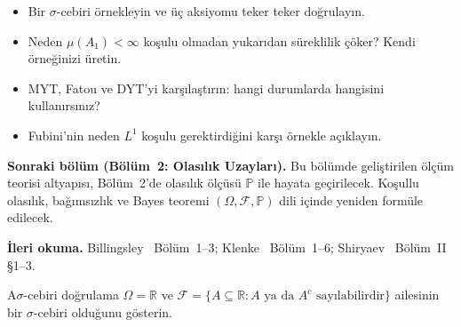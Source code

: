 \begin{ozyansima}
\begin{itemize}
  \item Bir $\sigma$-cebiri örnekleyin ve üç aksiyomu teker teker doğrulayın.
  \item Neden $\mu(A_1) < \infty$ koşulu olmadan yukarıdan süreklilik çöker?
        Kendi örneğinizi üretin.
  \item MYT, Fatou ve DYT'yi karşılaştırın: hangi durumlarda hangisini kullanırsınız?
  \item Fubini'nin neden $L^1$ koşulu gerektirdiğini karşı örnekle açıklayın.
\end{itemize}
\end{ozyansima}

\begin{kopru}
\textbf{Sonraki bölüm (Bölüm~2: Olasılık Uzayları).}
Bu bölümde geliştirilen ölçüm teorisi altyapısı, Bölüm~2'de olasılık ölçüsü
$\mathbb{P}$ ile hayata geçirilecek. Koşullu olasılık, bağımsızlık ve Bayes
teoremi $(\Omega,\mathcal{F},\mathbb{P})$ dili içinde yeniden formüle edilecek.

\medskip

\textbf{İleri okuma.}
Billingsley~\cite{billingsley1995} Bölüm~1--3;
Klenke~\cite{klenke2014} Bölüm~1--6;
Shiryaev~\cite{shiryaev1996} Bölüm~II §1--3.
\end{kopru}



\cozumlualistirmalar

\begin{alistirma}[Al.1.1]{A}{$\sigma$-cebiri doğrulama}
$\Omega = \mathbb{R}$ ve $\mathcal{F} = \{A \subseteq \mathbb{R} : A \text{ ya da } A^c
\text{ sayılabilirdir}\}$ ailesinin bir $\sigma$-cebiri olduğunu gösterin.
\end{alistirma}

